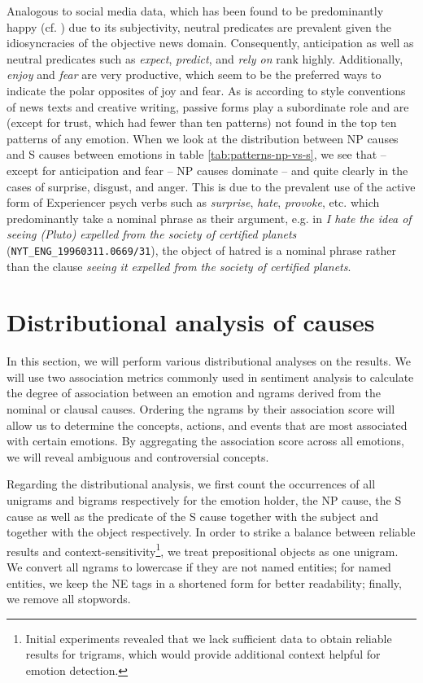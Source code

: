 Analogous to social media data, which has been found to be predominantly happy (cf. \cite{depechemood}) due to its subjectivity, neutral predicates are prevalent given the idiosyncracies of the objective news domain. Consequently, anticipation as well as neutral predicates such as \textit{expect}, \textit{predict}, and \textit{rely on} rank highly. Additionally, \textit{enjoy} and \textit{fear} are very productive, which seem to be the preferred ways to indicate the polar opposites of joy and fear. As is according to style conventions of news texts and creative writing, passive forms play a subordinate role and are (except for trust, which had fewer than ten patterns) not found in the top ten patterns of any emotion. When we look at the distribution between NP causes and S causes between emotions in table \ref{tab:patterns-np-vs-s}, we see that -- except for anticipation and fear -- NP causes dominate -- and quite clearly in the cases of surprise, disgust, and anger. This is due to the prevalent use of the active form of Experiencer psych verbs such as \textit{surprise}, \textit{hate}, \textit{provoke}, etc. which predominantly take a nominal phrase as their argument, e.g. in \textit{I hate the idea of seeing (Pluto) expelled from the society of certified planets} (\texttt{NYT\_ENG\_19960311.0669/31}), the object of hatred is a nominal phrase rather than the clause \textit{seeing it expelled from the society of certified planets}.

\section{Distributional analysis of causes} \label{sec:distributional_analysis_causes}

In this section, we will perform various distributional analyses on the results. We will use two association metrics commonly used in sentiment analysis to calculate the degree of association between an emotion and ngrams derived from the nominal or clausal causes. Ordering the ngrams by their association score will allow us to determine the concepts, actions, and events that are most associated with certain emotions. By aggregating the association score across all emotions, we will reveal ambiguous and controversial concepts.

Regarding the distributional analysis, we first count the occurrences of all unigrams and bigrams respectively for the emotion holder, the NP cause, the S cause as well as the predicate of the S cause together with the subject and together with the object respectively. In order to strike a balance between reliable results and context-sensitivity\footnote{Initial experiments revealed that we lack sufficient data to obtain reliable results for trigrams, which would provide additional context helpful for emotion detection.}, we treat prepositional objects as one unigram. We convert all ngrams to lowercase if they are not named entities; for named entities, we keep the NE tags in a shortened form for better readability; finally, we remove all stopwords.

